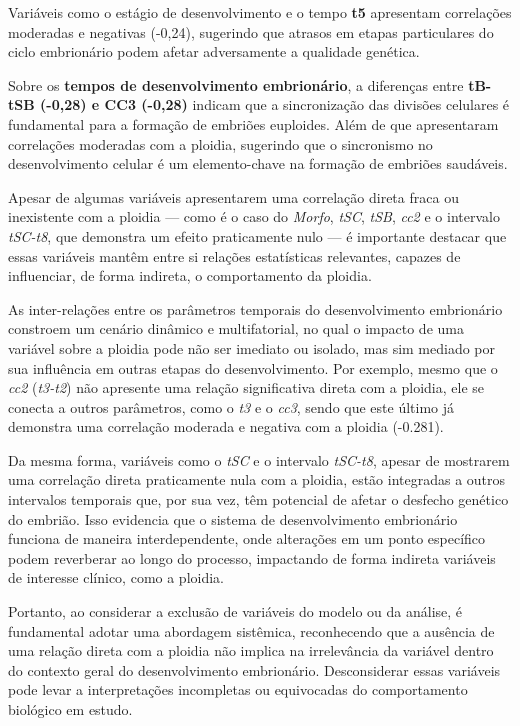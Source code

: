 Variáveis como o estágio de desenvolvimento e o tempo \textbf{t5} apresentam correlações moderadas e negativas (-0,24), sugerindo que atrasos em etapas particulares do ciclo embrionário podem afetar adversamente a qualidade genética.

Sobre os \textbf{tempos de desenvolvimento embrionário}, a diferenças entre \textbf{tB-tSB (-0,28) e CC3 (-0,28)} indicam que a sincronização das divisões celulares é fundamental para a formação de embriões euploides. Além de que apresentaram correlações moderadas com a ploidia, sugerindo que o sincronismo no desenvolvimento celular é um elemento-chave na formação de embriões saudáveis.

Apesar de algumas variáveis apresentarem uma correlação direta fraca ou inexistente com a ploidia — como é o caso do \textit{Morfo}, \textit{tSC}, \textit{tSB}, \textit{cc2} e o intervalo \textit{tSC-t8}, que demonstra um efeito praticamente nulo — é importante destacar que essas variáveis mantêm entre si relações estatísticas relevantes, capazes de influenciar, de forma indireta, o comportamento da ploidia. 

As inter-relações entre os parâmetros temporais do desenvolvimento embrionário constroem um cenário dinâmico e multifatorial, no qual o impacto de uma variável sobre a ploidia pode não ser imediato ou isolado, mas sim mediado por sua influência em outras etapas do desenvolvimento. Por exemplo, mesmo que o \textit{cc2} (\textit{t3-t2}) não apresente uma relação significativa direta com a ploidia, ele se conecta a outros parâmetros, como o \textit{t3} e o \textit{cc3}, sendo que este último já demonstra uma correlação moderada e negativa com a ploidia (-0.281).

Da mesma forma, variáveis como o \textit{tSC} e o intervalo \textit{tSC-t8}, apesar de mostrarem uma correlação direta praticamente nula com a ploidia, estão integradas a outros intervalos temporais que, por sua vez, têm potencial de afetar o desfecho genético do embrião. Isso evidencia que o sistema de desenvolvimento embrionário funciona de maneira interdependente, onde alterações em um ponto específico podem reverberar ao longo do processo, impactando de forma indireta variáveis de interesse clínico, como a ploidia.

Portanto, ao considerar a exclusão de variáveis do modelo ou da análise, é fundamental adotar uma abordagem sistêmica, reconhecendo que a ausência de uma relação direta com a ploidia não implica na irrelevância da variável dentro do contexto geral do desenvolvimento embrionário. Desconsiderar essas variáveis pode levar a interpretações incompletas ou equivocadas do comportamento biológico em estudo.

